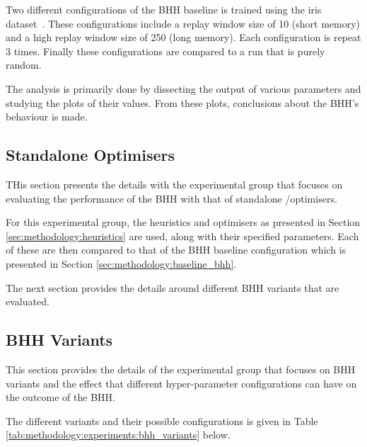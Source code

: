 Two different configurations of the \ac{BHH} baseline is trained using the iris dataset~\cite{ref:fisher:1936}. These configurations include a replay window size of 10 (short memory) and a high replay window size of 250 (long memory). Each configuration is repeat 3 times. Finally these configurations are compared to a run that is purely random.

The analysis is primarily done by dissecting the output of various parameters and studying the plots of their values. From these plots, conclusions about the \ac{BHH}'s behaviour is made.

\subsection{Standalone Optimisers}
\label{sec:methodology:experiments:standalone_optimisers}

THis section presents the details with the experimental group that focuses on evaluating the performance of the \ac{BHH} with that of standalone /optimisers.

For this experimental group, the heuristics and optimisers as presented in Section \ref{sec:methodology:heuristics} are used, along with their specified parameters. Each of these are then compared to that of the \ac{BHH} baseline configuration which is presented in Section \ref{sec:methodology:baseline_bhh}.

The next section provides the details around different \ac{BHH} variants that are evaluated.

\subsection{BHH Variants}
\label{sec:methodology:experiments:bhh_variants}

This section provides the details of the experimental group that focuses on \ac{BHH} variants and the effect that different hyper-parameter configurations can have on the outcome of the \ac{BHH}.

The different variants and their possible configurations is given in Table \ref{tab:methodology:experiments:bhh_variants} below.

